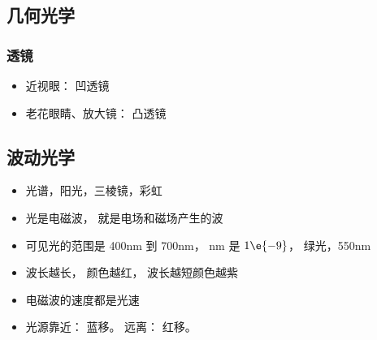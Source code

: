
\begin{issues}
\issueDraft
\end{issues}

\subsection{几何光学}
\subsubsection{透镜}
\begin{itemize}
\item 近视眼： 凹透镜
\item 老花眼睛、放大镜： 凸透镜
\end{itemize}

\subsection{波动光学}
\begin{itemize}
\item 光谱，阳光，三棱镜，彩虹
\item 光是电磁波， 就是电场和磁场产生的波
\item 可见光的范围是 400nm 到 700nm， nm 是 $1\e{-9}$， 绿光，550nm
\item 波长越长， 颜色越红， 波长越短颜色越紫
\item 电磁波的速度都是光速
\item 光源靠近： 蓝移。 远离： 红移。
\end{itemize}
